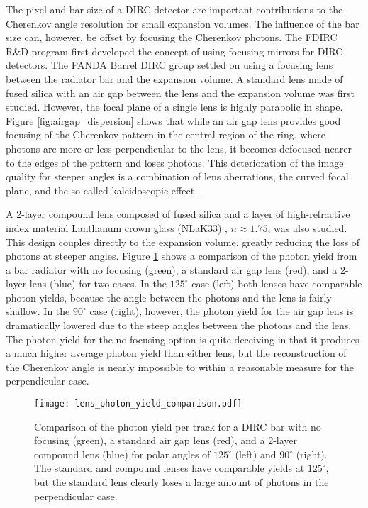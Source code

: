 The pixel and bar size of a DIRC detector are important contributions to the Cherenkov angle resolution for small expansion volumes. The influence of the bar size can, however, be offset by focusing the Cherenkov photons. The FDIRC R\&D program first developed the concept of using focusing mirrors for DIRC detectors. The PANDA Barrel DIRC group settled on using a focusing lens between the radiator bar and the expansion volume. A standard lens made of fused silica with an air gap between the lens and the expansion volume was first studied. However, the focal plane of a single lens is highly parabolic in shape. Figure \ref{fig:airgap_dispersion} shows that while an air gap lens provides good focusing of the Cherenkov pattern in the central region of the ring, where photons are more or less perpendicular to the lens, it becomes defocused nearer to the edges of the pattern and loses photons. This deterioration of the image quality for steeper angles is a combination of lens aberrations, the curved focal plane, and the so-called kaleidoscopic effect \cite{FDIRCMathematica}.

A 2-layer compound lens composed of fused silica and a layer of high-refractive index material Lanthanum crown glass (NLaK33) \cite{SchottData}, $n \approx 1.75$, was also studied. This design couples directly to the expansion volume, greatly reducing the loss of photons at steeper angles. Figure \ref{fig:lens_photon_yield} shows a comparison of the photon yield from a bar radiator with no focusing (green), a standard air gap lens (red), and a 2-layer lens (blue) for two cases. In the $125^\circ$ case (left) both lenses have comparable photon yields, because the angle between the photons and the lens is fairly shallow. In the $90^\circ$ case (right), however, the photon yield for the air gap lens is dramatically lowered due to the steep angles between the photons and the lens. The photon yield for the no focusing option is quite deceiving in that it produces a much higher average photon yield than either lens, but the reconstruction of the Cherenkov angle is nearly impossible to within a reasonable measure for the perpendicular case.

\begin{figure}[!htb]
	\centering
	\texttt{[image: lens\_photon\_yield\_comparison.pdf]}
	\caption[Comparison of the photon yield per track for a DIRC bar with no focusing (green), a standard air gap lens (red), and a 2-layer compound lens (blue) for polar angles of $125^\circ$ (left) and $90^\circ$ (right) \cite{GregThesis}. The standard and compound lenses have comparable yields at $125^\circ$, but the standard lens clearly loses a large amount of photons in the perpendicular case.]{Comparison of the photon yield per track for a DIRC bar with no focusing (green), a standard air gap lens (red), and a 2-layer compound lens (blue) for polar angles of $125^\circ$ (left) and $90^\circ$ (right). The standard and compound lenses have comparable yields at $125^\circ$, but the standard lens clearly loses a large amount of photons in the perpendicular case.}
	\label{fig:lens_photon_yield}
\end{figure}


